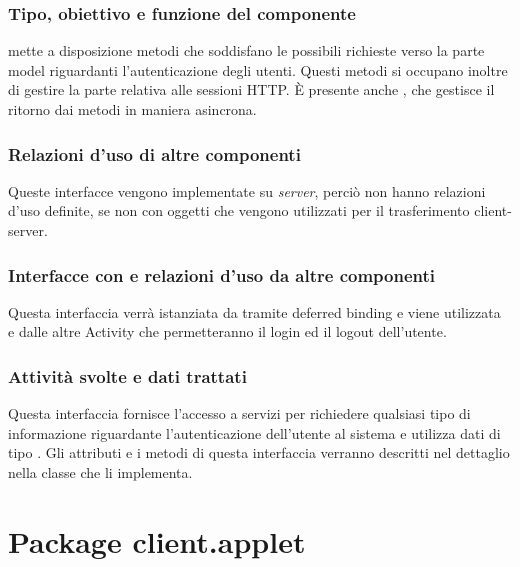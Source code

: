 \subsubsection*{Tipo, obiettivo e funzione del componente}
 mette a disposizione metodi
che soddisfano le possibili richieste verso la parte model riguardanti l'autenticazione degli utenti.
Questi metodi si occupano inoltre di gestire la parte relativa alle sessioni HTTP. 
\`E presente anche , che gestisce il ritorno dai
metodi in maniera asincrona.
\subsubsection*{Relazioni d'uso di altre componenti}
Queste interfacce vengono implementate su \emph{server}, perci\`o non
hanno relazioni d'uso definite, se non con oggetti  che
vengono utilizzati per il trasferimento client-server.
\subsubsection*{Interfacce con e relazioni d'uso da altre componenti}
Questa interfaccia verr\`a istanziata da  tramite deferred
binding e viene utilizzata \\ e dalle altre Activity che
permetteranno il login ed il logout dell'utente.
\subsubsection*{Attivit\`a svolte e dati trattati}
Questa interfaccia fornisce l'accesso a servizi per richiedere qualsiasi tipo
di informazione riguardante l'autenticazione dell'utente al sistema
e utilizza dati di tipo .
Gli attributi e i metodi di questa interfaccia verranno descritti nel
dettaglio nella classe  che li implementa. 


\newpage
\section{Package client.applet} %

